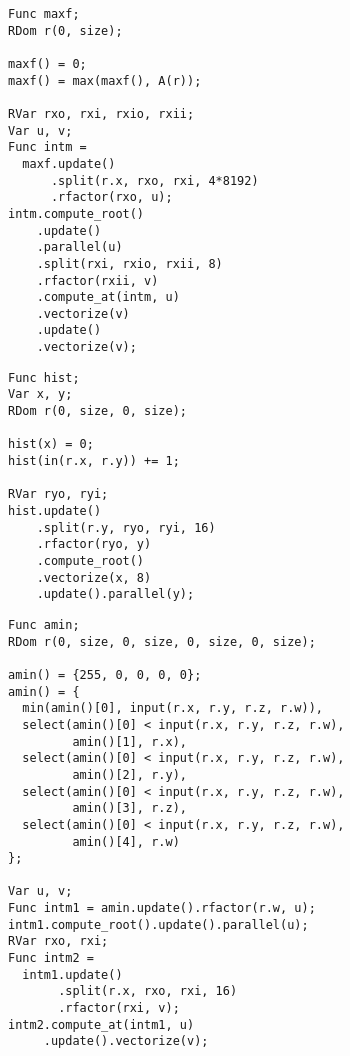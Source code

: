 
\begin{minipage}{\linewidth}
\begin{lstlisting}[caption={Maximum value over a 1D array}, label={lst:benchmark_max}]
Func maxf;
RDom r(0, size);

maxf() = 0;
maxf() = max(maxf(), A(r));

RVar rxo, rxi, rxio, rxii;
Var u, v;
Func intm =
  maxf.update()
      .split(r.x, rxo, rxi, 4*8192)
      .rfactor(rxo, u);
intm.compute_root()
    .update()
    .parallel(u)
    .split(rxi, rxio, rxii, 8)
    .rfactor(rxii, v)
    .compute_at(intm, u)
    .vectorize(v)
    .update()
    .vectorize(v);
\end{lstlisting}
\end{minipage}

\begin{minipage}{\linewidth}
\begin{lstlisting}[caption={Histogram of a two-dimensional image.}, label={lst:benchmark_histogram}]
Func hist;
Var x, y;
RDom r(0, size, 0, size);

hist(x) = 0;
hist(in(r.x, r.y)) += 1;

RVar ryo, ryi;
hist.update()
    .split(r.y, ryo, ryi, 16)
    .rfactor(ryo, y)
    .compute_root()
    .vectorize(x, 8)
    .update().parallel(y);
\end{lstlisting}
\end{minipage}


\begin{minipage}{\linewidth}
\begin{lstlisting}[caption={Argmin over 4D array}, label={lst:benchmark_argmin}]
Func amin;
RDom r(0, size, 0, size, 0, size, 0, size);

amin() = {255, 0, 0, 0, 0};
amin() = {
  min(amin()[0], input(r.x, r.y, r.z, r.w)),
  select(amin()[0] < input(r.x, r.y, r.z, r.w),
         amin()[1], r.x),
  select(amin()[0] < input(r.x, r.y, r.z, r.w),
         amin()[2], r.y),
  select(amin()[0] < input(r.x, r.y, r.z, r.w),
         amin()[3], r.z),
  select(amin()[0] < input(r.x, r.y, r.z, r.w),
         amin()[4], r.w)
};

Var u, v;
Func intm1 = amin.update().rfactor(r.w, u);
intm1.compute_root().update().parallel(u);
RVar rxo, rxi;
Func intm2 =
  intm1.update()
       .split(r.x, rxo, rxi, 16)
       .rfactor(rxi, v);
intm2.compute_at(intm1, u)
     .update().vectorize(v);
\end{lstlisting}
\end{minipage}

